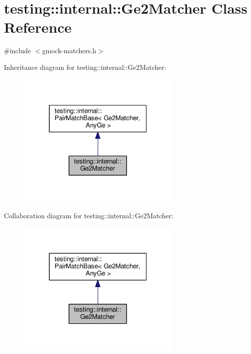 \hypertarget{classtesting_1_1internal_1_1Ge2Matcher}{}\section{testing\+:\+:internal\+:\+:Ge2\+Matcher Class Reference}
\label{classtesting_1_1internal_1_1Ge2Matcher}


{\ttfamily \#include $<$gmock-\/matchers.\+h$>$}



Inheritance diagram for testing\+:\+:internal\+:\+:Ge2\+Matcher\+:
\nopagebreak
\begin{figure}[H]
\begin{center}
\leavevmode
\includegraphics[width=229pt]{classtesting_1_1internal_1_1Ge2Matcher__inherit__graph}
\end{center}
\end{figure}


Collaboration diagram for testing\+:\+:internal\+:\+:Ge2\+Matcher\+:
\nopagebreak
\begin{figure}[H]
\begin{center}
\leavevmode
\includegraphics[width=229pt]{classtesting_1_1internal_1_1Ge2Matcher__coll__graph}
\end{center}
\end{figure}
